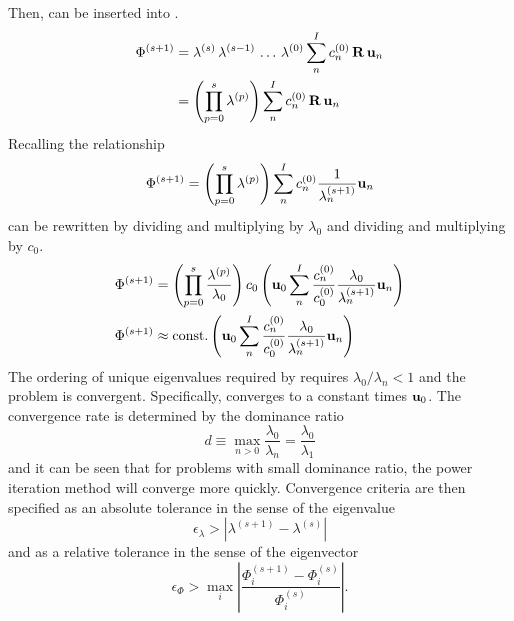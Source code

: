     Then,  can be inserted into
    .
    \begin{align}
      \Phi^{(s+1)} &= \lambda^{(s)} \, \lambda^{(s-1)} \, \ldots \, 
        \lambda^{(0)} \sum_n^I c_n^{(0)} \, \mathbf{R} \, \mathbf{u}_n \\
      &= \left( \prod_{p=0}^{s} \lambda^{(p)} \right) \sum_n^I c_n^{(0)} \, 
        \mathbf{R} \, \mathbf{u}_n
    \end{align}
    Recalling the relationship 
    \begin{equation}
      \label{eq:phi_expand_above}
      \Phi^{(s+1)} = \left( \prod_{p=0}^s \lambda^{(p)} \right) 
        \sum_n^I c_n^{(0)} \frac{1}{\lambda_n^{(s+1)}} \mathbf{u}_n
    \end{equation}
     can be rewritten by dividing and multiplying by
    $\lambda_0$ and dividing and multiplying by $c_0$.
    \begin{align}
      \Phi^{(s+1)} &= \left( \prod_{p=0}^s \frac{\lambda^{(p)}}{\lambda_0} 
        \right) c_0 \left( \mathbf{u}_0 \sum_n^I \frac{c_n^{(0)}}{c_0^{(0)}}
        \frac{\lambda_0}{\lambda_n^{(s+1)}} \mathbf{u}_n \right) \\
      \label{eq:eigen_phi_converge}
      \Phi^{(s+1)} &\approx \text{const.} \left( 
        \mathbf{u}_0 \sum_n^I \frac{c_n^{(0)}}{c_0^{(0)}}
        \frac{\lambda_0}{\lambda_n^{(s+1)}} \mathbf{u}_n \right)
    \end{align}
    The ordering of unique eigenvalues required by  
    requires $\lambda_0 / \lambda_n < 1$ and the problem is convergent. 
    Specifically,  converges to a constant times 
    $\mathbf{u}_0$. The convergence rate is determined by the dominance ratio
    \begin{equation}
      \label{eq:dominance_ratio}
      d \equiv \max_{n>0} \frac{\lambda_0}{\lambda_n} =
        \frac{\lambda_0}{\lambda_1}
    \end{equation}
    and it can be seen that for problems with small dominance ratio, the power
    iteration method will converge more quickly. Convergence criteria are then
    specified as an absolute tolerance in the sense of the eigenvalue
    \begin{equation}
      \label{eq:eigenvalue_tol}
      \epsilon_{\lambda} > | \lambda^{(s+1)} - \lambda^{(s)} |
    \end{equation}
    and as a relative tolerance in the sense of the eigenvector
    \begin{equation}
      \label{eq:eigenvector_tol}
      \epsilon_{\Phi} > \max_i \left| \frac{\Phi_i^{(s+1)} - \Phi_i^{(s)}}
        {\Phi_i^{(s)}}\right| .
    \end{equation}

